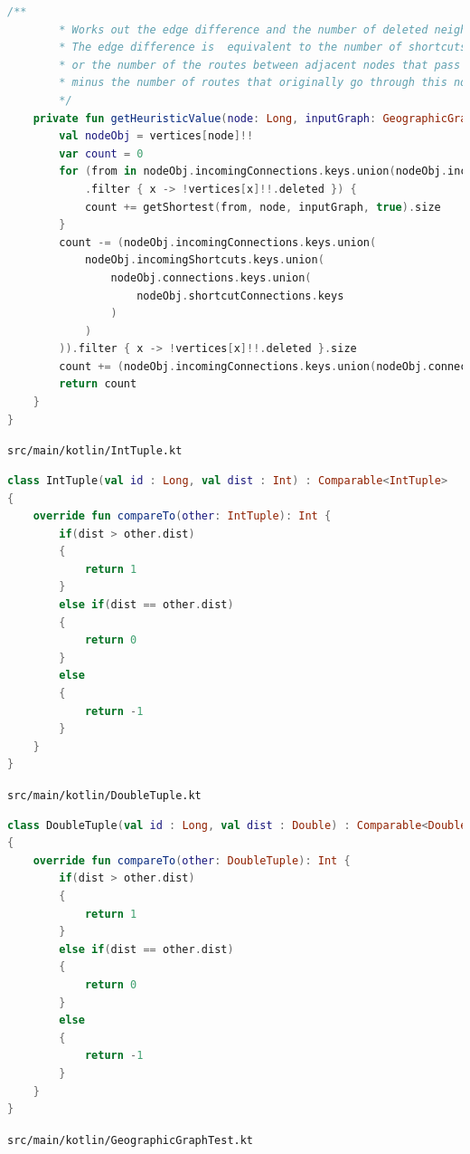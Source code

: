 \documentclass[11pt,twoside,a4paper]{report}
\begin{document}
\begin{lstlisting}[language=kotlin]
    /**
        * Works out the edge difference and the number of deleted neighbours and uses these to calculate a heuristic
        * The edge difference is  equivalent to the number of shortcuts that would be added if the node were to be deleted
        * or the number of the routes between adjacent nodes that pass through this node
        * minus the number of routes that originally go through this node.
        */
    private fun getHeuristicValue(node: Long, inputGraph: GeographicGraph): Int {
        val nodeObj = vertices[node]!!
        var count = 0
        for (from in nodeObj.incomingConnections.keys.union(nodeObj.incomingShortcuts.keys)
            .filter { x -> !vertices[x]!!.deleted }) {
            count += getShortest(from, node, inputGraph, true).size
        }
        count -= (nodeObj.incomingConnections.keys.union(
            nodeObj.incomingShortcuts.keys.union(
                nodeObj.connections.keys.union(
                    nodeObj.shortcutConnections.keys
                )
            )
        )).filter { x -> !vertices[x]!!.deleted }.size
        count += (nodeObj.incomingConnections.keys.union(nodeObj.connections.keys)).count { x -> vertices[x]!!.deleted }//maintains uniformity
        return count
    }
}
\end{lstlisting}
\texttt{src/main/kotlin/IntTuple.kt}
\begin{lstlisting}[language=kotlin]
class IntTuple(val id : Long, val dist : Int) : Comparable<IntTuple>
{
    override fun compareTo(other: IntTuple): Int {
        if(dist > other.dist)
        {
            return 1
        }
        else if(dist == other.dist)
        {
            return 0
        }
        else
        {
            return -1
        }
    }
}
\end{lstlisting}
\texttt{src/main/kotlin/DoubleTuple.kt}
\begin{lstlisting}[language=kotlin]
class DoubleTuple(val id : Long, val dist : Double) : Comparable<DoubleTuple>
{
    override fun compareTo(other: DoubleTuple): Int {
        if(dist > other.dist)
        {
            return 1
        }
        else if(dist == other.dist)
        {
            return 0
        }
        else
        {
            return -1
        }
    }
}   
\end{lstlisting}
\texttt{src/main/kotlin/GeographicGraphTest.kt}
\end{document}
